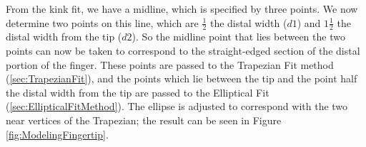 From the kink fit, we have a midline, which is specified by three points. We now determine two points on this line, which are $\frac{1}{2}$ the distal width ($d1$) and $1\frac{1}{2}$ the distal width from the tip ($d2$). So the midline point that lies between the two points can now be taken to correspond to the straight-edged section of the distal portion of the finger. These points are passed to the Trapezian Fit method (\ref{sec:TrapezianFit}), and the points which lie between the tip and the point half the distal width from the tip are passed to the Elliptical Fit (\ref{sec:EllipticalFitMethod}). The ellipse is adjusted to correspond with the two near vertices of the Trapezian; the result can be seen in Figure \ref{fig:ModelingFingertip}.
\begin{figure}[h!]
  \centering
  \noindent
  

\end{figure}

